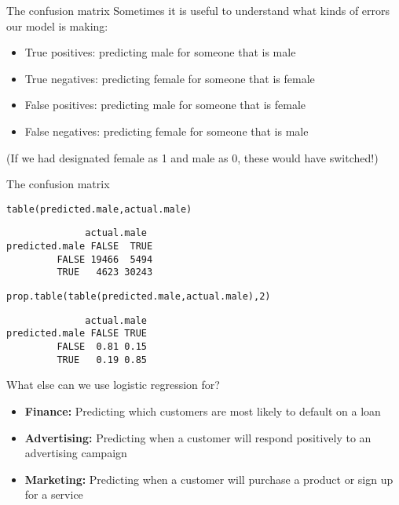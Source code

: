 \documentclass{beamer}\usepackage[]{graphicx}\usepackage[]{color}
\makeatletter
\newcommand{\hlnum}[1]{\textcolor[rgb]{0.824,0.412,0.118}{#1}}%
\newcommand{\hlstd}[1]{\textcolor[rgb]{1,0.894,0.769}{#1}}%
\newcommand{\hlkwd}[1]{\textcolor[rgb]{1,0.78,0.769}{#1}}%
\newenvironment{kframe}{%
 \def\at@end@of@kframe{}%
 \ifinner\ifhmode%
  \def\at@end@of@kframe{\end{minipage}}%
  \begin{minipage}{\columnwidth}%
 \fi\fi%
 \def\FrameCommand##1{\hskip\@totalleftmargin \hskip-\fboxsep
 \colorbox{shadecolor}{##1}\hskip-\fboxsep
     \hskip-\linewidth \hskip-\@totalleftmargin \hskip\columnwidth}%
 \MakeFramed {\advance\hsize-\width
   \@totalleftmargin\z@ \linewidth\hsize
   \@setminipage}}%
 {\par\unskip\endMakeFramed%
 \at@end@of@kframe}
\newenvironment{knitrout}{}{} %
\makeatother
\begin{document}
\begin{darkframes}
    \begin{frame}{The confusion matrix}
      Sometimes it is useful to understand what kinds of errors our model is making:
      \begin{itemize}
        \item \alert{True positives}: predicting male for someone that is male
        \item \alert{True negatives}: predicting female for someone that is female
        \item \alert{False positives}: predicting male for someone that is female
        \item \alert{False negatives}: predicting female for someone that is male
      \end{itemize}
      (If we had designated female as 1 and male as 0, these would have switched!)
    \end{frame}

    \begin{frame}[fragile]{The confusion matrix}
\begin{knitrout}
\begin{kframe}
\begin{alltt}
\hlkwd{table}\hlstd{(predicted.male, actual.male)}
\end{alltt}
\begin{verbatim}
              actual.male
predicted.male FALSE  TRUE
         FALSE 19466  5494
         TRUE   4623 30243
\end{verbatim}
\begin{alltt}
\hlkwd{prop.table}\hlstd{(}\hlkwd{table}\hlstd{(predicted.male, actual.male),} \hlnum{2}\hlstd{)}
\end{alltt}
\begin{verbatim}
              actual.male
predicted.male FALSE TRUE
         FALSE  0.81 0.15
         TRUE   0.19 0.85
\end{verbatim}
\end{kframe}
\end{knitrout}
    \end{frame}

    \begin{frame}{What else can we use logistic regression for?}
      \begin{itemize}
        \item \textbf{Finance:} Predicting which customers are most likely to default on a loan
        \item \textbf{Advertising:} Predicting when a customer will respond positively to an advertising campaign
        \item \textbf{Marketing:} Predicting when a customer will purchase a product or sign up for a service
      \end{itemize}
    \end{frame}
  \end{darkframes}
\end{document}
